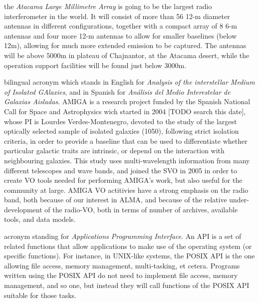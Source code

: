 {
    	the \emph{Atacama Large Millimetre Array} is going to be the
        largest radio interferometer in the world. It will consist of
        more than 56 12-m diameter antennas in different
        configurations, together with a compact array of 8 6-m antennas
        and four more 12-m antennas to allow for smaller baselines
        (below 12m), allowing for much more extended emission to be
        captured. The antennas will be above 5000m in plateau of
        Chajnantor, at the Atacama desert, while the operation support
        facilities will be found just below 3000m.
}

{
    	bilingual acronym which stands in English for \emph{Analysis of
        the interstellar Medium of Isolated GAlaxies}, and in Spanish
        for \emph{Análisis del Medio Interestelar de Galaxias
        Aisladas}. AMIGA is a research project funded by the Spanish
        National Call for Space and Astrophysics wich started in 2004
        [TODO search this date], whose PI is Lourdes Verdes-Montenegro,
        devoted to the study of the largest optically selected sample
        of isolated galaxies (1050), following strict isolation
        criteria, in order to provide a baseline that can be used to
        differentiate whether particular galactic traits are intrinsic,
        or depend on the interaction with neighbouring galaxies. This
        study uses multi-wavelength information from many different
        telescopes and wave bands, and joined the \gls{SVO} in 2005
        in order to create \gls{VO} tools needed for performing
        AMIGA's work, but also useful for the community at large. AMIGA
        VO actitivies have a strong emphasis on the radio band, both
        because of our interest in \gls{ALMA}, and because of the
        relative under-development of the radio-VO, both in terms of
        number of archives, available tools, and data models.
}

{
    	acronym standing for \emph{Applications Programming Interface}.
        An API is a set of related functions that allow applications to
        make use of the operating system (or specific functions). For
        instance, in UNIX-like systems, the POSIX API is the one
        allowing file access, memory management, multi-tasking, et
        cetera. Programs written using the POSIX API do not need to
        implement file access, memory management, and so one, but
        instead they will call functions of the POSIX API suitable for
        those tasks.
}

